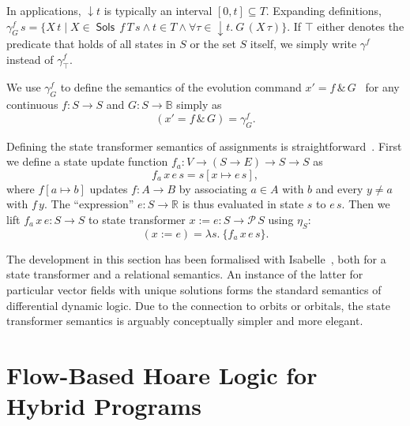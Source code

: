 \documentclass[envcountsames]{llncs}
\newcommand{\Pow}{\mathcal{P}}
\newcommand{\reals}{\mathbb{R}}
\newcommand{\bools}{\mathbb{B}}
\newcommand{\Sols}{\mathop{\mathsf{Sols}}}
\begin{document}
In applications, ${\downarrow}t$ is typically an interval
$[0,t]\subseteq T$.  Expanding definitions,
$\gamma^f_G\, s = \{X\, t \mid X\in \Sols\, f\, T\, s \land t\in T
\land \forall \tau\in{\downarrow}t.\ G\, (X\, \tau)\}$.
If $\top$ either denotes the predicate that holds of all states in $S$
or the set $S$ itself, we simply write $\gamma^f$ instead of
$\gamma^f_\top$.

We use $\gamma^f_G$ to define the semantics of the evolution command
$x'= f\, \&\, G$~\cite{MuniveS19} for any continuous $f:S\to S$ and
$G:S\to \bools$ simply as
\begin{equation}
{(x'= f\, \&\, G)} = \gamma^f_G.\label{eq:st-evl}\tag{st-evl}
\end{equation}

Defining the state transformer semantics of assignments is
straightforward~\cite{MuniveS19}. First we define a state update
function $f_a:V\to (S \to E) \to S\to S$ as
\begin{equation*}
f_a\, x\, e\, s = s[x\mapsto e\, s],
\end{equation*}
where $f[a\mapsto b]$ updates $f:A\to B$ by associating $a\in A$ with
$b$ and every $y\neq a$ with $f\, y$.  The ``expression''
${e:S\to \reals}$ is thus evaluated in state $s$ to $e\, s$.  Then we
lift $f_a\, x\, e:S\to S$ to state transformer
$x:= e:S \to \Pow\, S$ using $\eta_S$:
\begin{equation}
  (x:= e) = \lambda s.\ \{f_a\, x\, e\, s\}.\label{eq:st-assgn}\tag{st-assgn}
\end{equation}

The development in this section has been formalised with
Isabelle~\cite{afp:hybrid}, both for a state transformer and a
relational semantics. An instance of the latter for particular vector
fields with unique solutions forms the standard semantics of
differential dynamic logic. Due to the connection to orbits or
orbitals, the state transformer semantics is arguably conceptually
simpler and more elegant.




\section{Flow-Based Hoare Logic for Hybrid
  Programs}\label{sec:hoare-flow}
\end{document}
